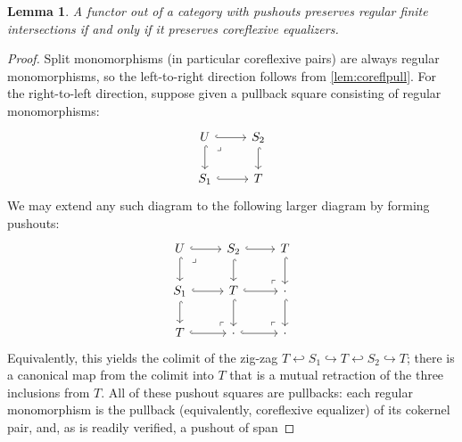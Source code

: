 \documentclass[11pt, oneside, article]{memoir}
\theoremstyle{plain}
\newtheorem{lemma}[theorem]{Lemma}
\theoremstyle{definition}
\theoremstyle{remark}
\newcommand{\xS}{S}
\newcommand{\xT}{T}
\newcommand{\xU}{U}
\begin{document}
\begin{lemma}\label{lem:functorpreserve}
  A functor out of a category with pushouts preserves regular finite
  intersections if and only if it preserves coreflexive equalizers.
\end{lemma}
\begin{proof}
  Split monomorphisms (in particular coreflexive pairs) are always
  regular monomorphisms, so the left-to-right direction follows from
  \cref{lem:coreflpull}. For the right-to-left direction, suppose
  given a pullback square consisting of regular monomorphisms:
  \[\begin{tikzcd}
      \xU & {\xS_2} \\
      {\xS_1} & \xT
      \arrow[hook, from=1-1, to=1-2]
      \arrow[hook, from=1-1, to=2-1]
      \arrow["\lrcorner"{anchor=center, pos=0.125}, draw=none, from=1-1, to=2-2]
      \arrow[hook, from=1-2, to=2-2]
      \arrow[hook, from=2-1, to=2-2]
    \end{tikzcd}\]
  We may extend any such diagram to the following larger diagram by
  forming pushouts:
  \[\begin{tikzcd}
      \xU & {\xS_2} & \xT \\
      {\xS_1} & \xT & \cdot \\
      \xT & \cdot & \cdot
      \arrow[hook, from=1-1, to=1-2]
      \arrow[hook, from=1-1, to=2-1]
      \arrow["\lrcorner"{anchor=center, pos=0.125}, draw=none, from=1-1, to=2-2]
      \arrow[hook, from=1-2, to=1-3]
      \arrow[hook, from=1-2, to=2-2]
      \arrow[hook, from=1-3, to=2-3]
      \arrow[hook, from=2-1, to=2-2]
      \arrow[hook, from=2-1, to=3-1]
      \arrow[hook, from=2-2, to=2-3]
      \arrow[hook, from=2-2, to=3-2]
      \arrow["\lrcorner"{anchor=center, pos=0.125, rotate=180}, draw=none, from=2-3, to=1-2]
      \arrow[hook, from=2-3, to=3-3]
      \arrow[hook, from=3-1, to=3-2]
      \arrow["\lrcorner"{anchor=center, pos=0.125, rotate=180}, draw=none, from=3-2, to=2-1]
      \arrow[hook, from=3-2, to=3-3]
      \arrow["\lrcorner"{anchor=center, pos=0.125, rotate=180}, draw=none, from=3-3, to=2-2]
    \end{tikzcd}\] Equivalently, this yields the colimit of the
  zig-zag
  $\xT \hookleftarrow \xS_1 \hookrightarrow \xT \hookleftarrow \xS_2
  \hookrightarrow \xT$; there is a canonical map from the colimit into
  $\xT$ that is a mutual retraction of the three inclusions from
  $\xT$. All of these pushout squares are pullbacks: each regular
  monomorphism is the pullback (equivalently, coreflexive equalizer)
  of its cokernel pair, and, as is readily verified, a pushout of span

\end{proof}
\end{document}
